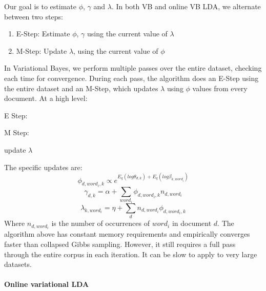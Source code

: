 \documentclass[12pt]{report}
\begin{document}
Our goal is to estimate $\phi$, $\gamma$ and $\lambda$. In both VB and 
online VB LDA, we alternate between two steps:
\begin{enumerate}
\item E-Step: Estimate $\phi$, $\gamma$ using the current value of $\lambda$
\item M-Step: Update $\lambda$, using the current value of $\phi$
\end{enumerate}

In Variational Bayes, we perform multiple passes over the entire dataset, 
checking each time for convergence. During each pass, the algorithm does an 
E-Step using the entire dataset and an M-Step, which updates $\lambda$ using 
$\phi$ values from every document. At a high level:

\begin{algorithm}
\SetAlgoNoLine
E Step:

M Step:

update $\lambda$
\end{algorithm}

The specific updates are:
\begin{equation}
\phi_{d,word_{i},k} \propto e^{E_{q}(log \theta_{d,k})+E_{q}(log\beta_{k,word_{i}})}
\end{equation}
\begin{equation}
\gamma_{d,k} = \alpha + \sum_{word_{i}}\phi_{d,word_{i},k}n_{d,word_{i}}
\end{equation}
\begin{equation}
\lambda_{k,word_{i}}=\eta +\sum_{d}n_{d,word_{i}}\phi_{d,word_{i},k}
\end{equation}
Where $n_{d,word_{i}}$ is the number of occurrences of $word_{i}$ in document $d$.
The algorithm above has constant memory requirements and empirically
converges faster than collapsed Gibbs sampling. However, it still requires a
full pass through the entire corpus in each iteration. It can be slow to apply
to very large datasets.

\paragraph{Online variational LDA}
\end{document}
